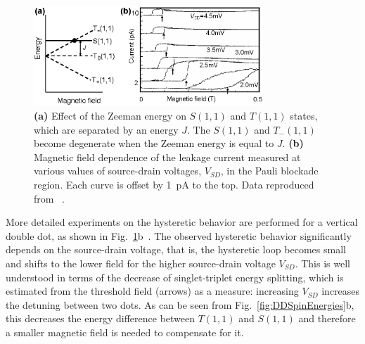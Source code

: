 \documentclass[12pt,aps,nofootinbib]{revtex4-1}
\begin{document}
\begin{figure}[tb]
\includegraphics[width=3.4in, clip=true]{hanson_fig37.eps}
\caption{\textbf{(a)} Effect of the Zeeman energy on $S(1,1)$ and $T(1,1)$ states,
which are separated by an energy $J$. The $S(1,1)$ and
$T_-(1,1)$ become degenerate when the Zeeman energy is
equal to $J$. \textbf{(b)} Magnetic field
dependence of the leakage current measured at various values of
source-drain voltages, $V_{SD}$, in the Pauli blockade region. Each
curve is offset by 1~pA to the top. Data reproduced from
~\textcite{Tarucha06}.} \label{Fig:DDOno2}
\end{figure}

More detailed experiments on the hysteretic behavior are performed
for a vertical double dot, as shown in
Fig.~\ref{Fig:DDOno2}b~\cite{Tarucha06}. The observed hysteretic
behavior significantly depends on the source-drain voltage, that
is, the hysteretic loop becomes small and shifts to the lower
field for the higher source-drain voltage $V_{SD}$. This is well
understood in terms of the decrease of singlet-triplet energy splitting, which is
estimated from the threshold field (arrows) as a measure:
increasing $V_{SD}$ increases the detuning between two
dots. As can be seen from Fig.~\ref{fig:DDSpinEnergies}b, this decreases the energy difference between $T(1,1)$ and $S(1,1)$ and therefore a smaller magnetic field is needed to compensate for it.
\end{document}

